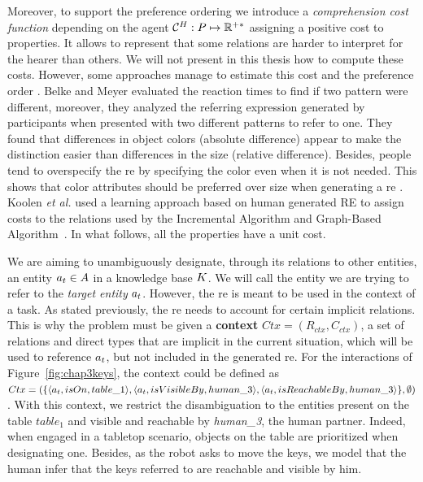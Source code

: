 \documentclass[a4paper,11pt,twoside]{StyleThese}
\begin{document}
Moreover, to support the preference ordering we introduce a \textit{comprehension cost function} depending on the agent $\mathcal{C}^H: P \mapsto \mathbb{R}^{+*}$ assigning a positive cost to properties. It allows to represent that some relations are harder to interpret for the hearer than others. We will not present in this thesis how to compute these costs. However, some approaches manage to estimate this cost and the preference order \cite{belke2002tracking, koolen2012learning}. Belke and Meyer evaluated the reaction times to find if two pattern were different, moreover, they analyzed the referring expression generated by participants when presented with two different patterns to refer to one. They found that differences in object colors (absolute difference) appear to make the distinction easier than differences in the size (relative difference). Besides, people tend to overspecify the \acrfull{re} by specifying the color even when it is not needed. This shows that color attributes should be preferred over size when generating a \acrshort{re} \cite{belke2002tracking}. Koolen \textit{et al.} used a learning approach based on human generated RE to assign costs to the relations used by the Incremental Algorithm and Graph-Based Algorithm~\cite{koolen2012learning}. In what follows, all the properties have a unit cost.

We are aiming to unambiguously designate, through its relations to other entities, an entity $a_t \in A$ in a knowledge base $K$. We will call the entity we are trying to refer to the \textit{target entity} $a_t$.
However, the \acrshort{re} is meant to be used in the context of a task. As stated previously, the \acrshort{re} needs to account for certain implicit relations. This is why the problem must be given a \textbf{context} $Ctx = (R_{ctx}, C_{ctx})$, a set of relations and direct types that are implicit in the current situation, which will be used to reference $a_t$, but not included in the generated \acrshort{re}. For the interactions of Figure~\ref{fig:chap3keys}, the context could be defined as $Ctx = (\{ \langle a_t, isOn, table\_1 \rangle, \langle a_t, isVisibleBy, human\_3 \rangle, \langle a_t, isReachableBy, human\_3 \rangle \}, \emptyset)$. With this context, we restrict the disambiguation to the entities present on the table $table_1$ and visible and reachable by \textit{human\_3}, the human partner. Indeed, when engaged in a tabletop scenario, objects on the table are prioritized when designating one. Besides, as the robot asks to move the keys, we model that the human infer that the keys referred to are reachable and visible by him.
\end{document}
